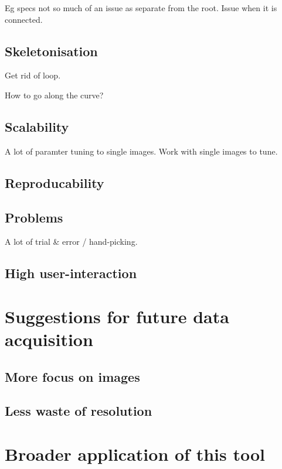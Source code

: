 Eg specs not so much of an issue as separate from the root.
Issue when it is connected.

\subsection{Skeletonisation}
Get rid of loop.

How to go along the curve?

\subsection{Scalability}

A lot of paramter tuning to single images. Work with single images to tune.


\subsection{Reproducability}

\subsection{Problems}
A lot of trial \& error / hand-picking. 

\subsection{High user-interaction}


\section{Suggestions for future data acquisition}


\subsection{More focus on images}

\subsection{Less waste of resolution}


 

\section{Broader application of this tool}


